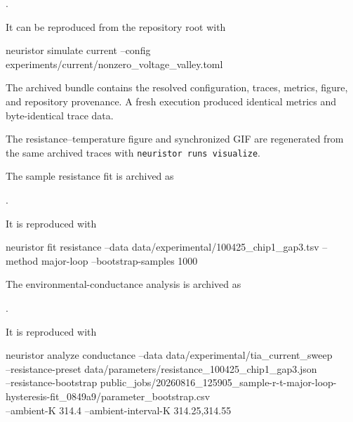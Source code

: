 \documentclass[11pt]{article}
\begin{document}
\begin{center}
\footnotesize
{}.
\end{center}

It can be reproduced from the repository root with

\begin{center}
\ttfamily\small
neuristor simulate current --config experiments/current/nonzero\_voltage\_valley.toml
\end{center}

The archived bundle contains the resolved configuration, traces, metrics, figure, and repository provenance. A fresh execution produced identical metrics and byte-identical trace data.

The resistance--temperature figure and synchronized GIF are regenerated from the same archived traces with \texttt{neuristor runs visualize}.

The sample resistance fit is archived as

\begin{center}
\footnotesize
{}.
\end{center}

It is reproduced with

\begin{center}
\ttfamily\small
neuristor fit resistance --data data/experimental/100425\_chip1\_gap3.tsv --method major-loop --bootstrap-samples 1000
\end{center}

The environmental-conductance analysis is archived as

\begin{center}
\footnotesize
{}.
\end{center}

It is reproduced with

\begin{center}
\ttfamily\footnotesize
neuristor analyze conductance --data data/experimental/tia\_current\_sweep \\
--resistance-preset data/parameters/resistance\_100425\_chip1\_gap3.json \\
--resistance-bootstrap public\_jobs/20260816\_125905\_sample-r-t-major-loop-hysteresis-fit\_0849a9/parameter\_bootstrap.csv \\
--ambient-K 314.4 --ambient-interval-K 314.25,314.55
\end{center}
\end{document}
